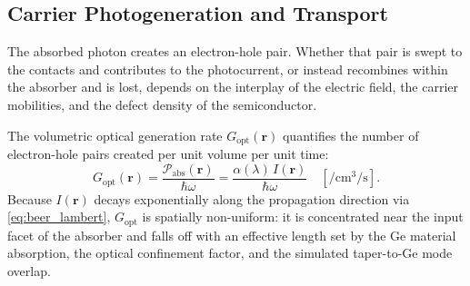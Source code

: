
\subsection[Carrier Photogeneration and Transport]{Carrier Photogeneration and Transport}
\label{subsec:pd_generation}

The absorbed photon creates an electron-hole pair. Whether that pair is swept
to the contacts and contributes to the photocurrent, or instead recombines
within the absorber and is lost, depends on the interplay of the electric
field, the carrier mobilities, and the defect density of the semiconductor.

The volumetric optical generation rate $G_{\mathrm{opt}}(\mathbf{r})$ quantifies
the number of electron-hole pairs created per unit volume per unit time:
\begin{equation}
    G_{\mathrm{opt}}(\mathbf{r})
    = \frac{\mathcal{P}_{\mathrm{abs}}(\mathbf{r})}{\hbar\omega}
    = \frac{\alpha(\lambda)\,I(\mathbf{r})}{\hbar\omega}
    \quad [\si{\per\centi\metre\cubed\per\second}].
    \label{eq:gen_rate}
\end{equation}
Because $I(\mathbf{r})$ decays exponentially along the propagation direction via
\cref{eq:beer_lambert}, $G_{\mathrm{opt}}$ is spatially non-uniform: it is
concentrated near the input facet of the absorber and falls off with an
effective length set by the Ge material absorption, the optical confinement
factor, and the simulated taper-to-Ge mode overlap.

